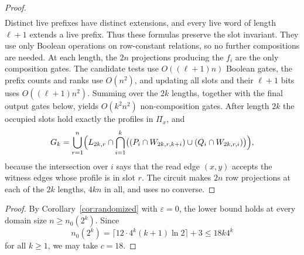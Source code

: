\begin{proof}
\[\begin{aligned}
\end{aligned}
\]
Distinct live prefixes have distinct extensions, and every live word
of length $\ell+1$ extends a live prefix. Thus these formulas preserve
the slot invariant. They use only Boolean operations on row-constant
relations, so no further compositions are needed. At each length, the
$2n$ projections producing
the $f_i$ are the only composition gates. The candidate tests use
$O((\ell+1)n)$ Boolean gates, the prefix counts and ranks use
$O(n^2)$, and updating all slots and their $\ell+1$ bits uses
$O((\ell+1)n^2)$. Summing over the $2k$ lengths, together with the
final output gates below, yields $O(k^2n^2)$ non-composition gates.
After length $2k$ the occupied slots
hold exactly the profiles in $\Pi_x$, and
\[
 G_k=\bigcup_{r=1}^{n}\Bigl(L_{2k,r}\cap\bigcap_{i=1}^k
 \bigl((P_i\cap W_{2k,r,k+i})\cup(Q_i\cap W_{2k,r,i})\bigr)\Bigr),
\]
because the intersection over $i$ says that the read edge $(x,y)$
accepts the witness edges whose profile is in slot $r$. The circuit
makes $2n$ row projections
at each of the $2k$ lengths, $4kn$ in all, and uses no converse.
\end{proof}

\domainsize*
\begin{proof}
By Corollary~\ref{cor:randomized} with $\varepsilon=0$, the lower
bound holds at every domain size $n\ge n_0(2^k)$. Since
\[
n_0(2^k)=\lceil12\cdot4^k(k+1)\ln2\rceil+3\le18k4^k
\]
for all $k\ge1$, we may take $c=18$.
\end{proof}

